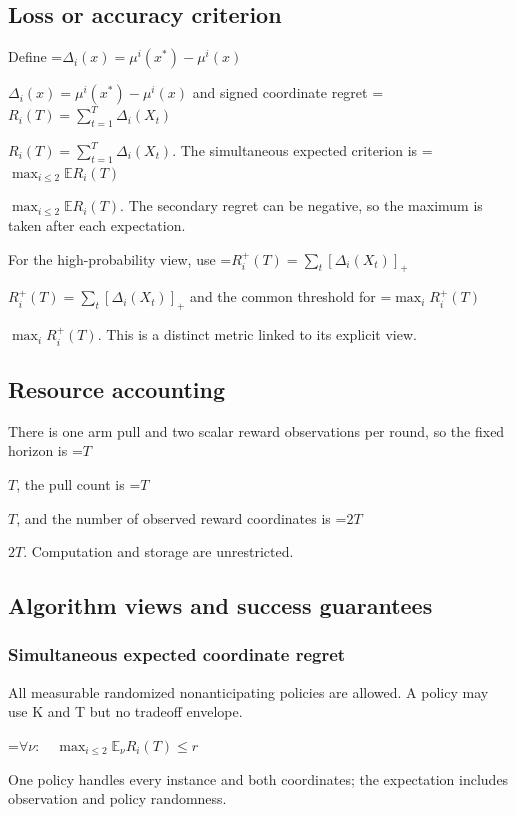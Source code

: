 \documentclass[10pt,a4paper]{article}
\newcommand{\AtlasMath}[1]{\par\begingroup\centering\setbox0=\hbox{$\displaystyle #1$}\ifdim\wd0>1.4\linewidth\typeout{ATLAS WIDE FORMULA: \the\wd0}\fi\ifdim\wd0>\linewidth\resizebox{\linewidth}{!}{\box0}\else\box0\fi\par\endgroup}
\newcommand{\AtlasInlineMath}[1]{\begingroup\setbox0=\hbox{$#1$}\ifdim\wd0>.4\linewidth\endgroup\AtlasMath{#1}\else\endgroup$#1$\fi}
\begin{document}
\subsection{Loss or accuracy criterion}


Define \AtlasInlineMath{\Delta_i(x)=\mu^i(x^*)-\mu^i(x)} and signed coordinate regret \AtlasInlineMath{R_i(T)=\sum_{t=1}^T\Delta_i(X_t)}. The simultaneous expected criterion is \AtlasInlineMath{\max_{i\le2}\mathbb E R_i(T)}. The secondary regret can be negative, so the maximum is taken after each expectation.



For the high-probability view, use \AtlasInlineMath{R_i^+(T)=\sum_t[\Delta_i(X_t)]_+} and the common threshold for \AtlasInlineMath{\max_iR_i^+(T)}. This is a distinct metric linked to its explicit view.



\subsection{Resource accounting}


There is one arm pull and two scalar reward observations per round, so the fixed horizon is \AtlasInlineMath{T}, the pull count is \AtlasInlineMath{T}, and the number of observed reward coordinates is \AtlasInlineMath{2T}. Computation and storage are unrestricted.



\subsection{Algorithm views and success guarantees}


\subsubsection{Simultaneous expected coordinate regret}


All measurable randomized nonanticipating policies are allowed. A policy may use K and T but no tradeoff envelope.




\AtlasMath{\forall\nu:\quad\max_{i\le2}\mathbb E_\nu R_i(T)\le r}




One policy handles every instance and both coordinates; the expectation includes observation and policy randomness.
\end{document}
